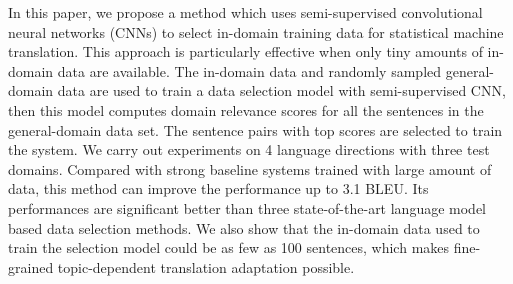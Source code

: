 In this paper, we propose a method which uses semi-supervised convolutional neural networks (CNNs) to select in-domain training data for statistical machine translation. This approach is particularly effective when only tiny amounts of in-domain data are available. The in-domain data and randomly sampled general-domain data are used to train a data selection model with semi-supervised CNN, then this model computes domain relevance scores for all the sentences in the general-domain data set. The sentence pairs with top scores are selected to train the system. We carry out experiments on 4 language directions with three test domains. Compared with strong baseline systems trained with large amount of data,   this method can improve the performance up to 3.1 BLEU.  Its performances are significant better than three state-of-the-art language model based data selection methods. We also show that the in-domain data used to train the selection model could be as few as 100 sentences, which makes fine-grained topic-dependent translation adaptation possible.
